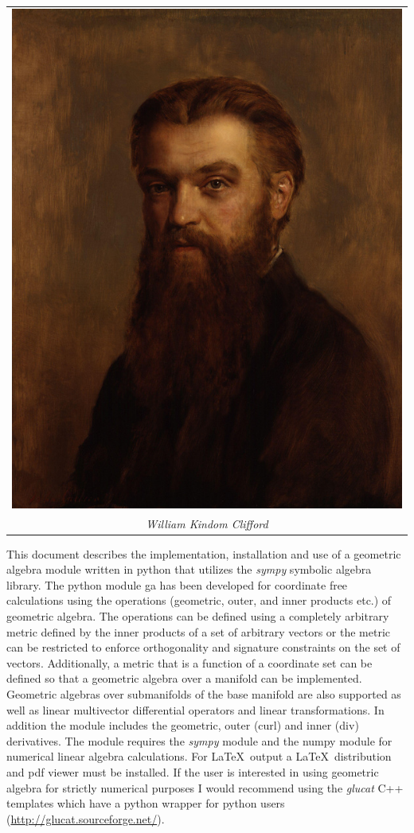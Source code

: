 \documentclass[12pt]{report}
\begin{document}
\begin{center}
\begin{tabular}{c}
\includegraphics[scale=0.25]{wkclifford.jpg} \\
\emph{William Kindom Clifford}
\end{tabular} 
\end{center}

   This document describes the implementation, installation and use of a
   geometric algebra module written in
   python that utilizes the \emph{sympy} symbolic algebra library.  The python
   module ga has been developed for coordinate free calculations using
   the operations (geometric, outer, and inner products etc.) of geometric algebra.
   The operations can be defined using a completely arbitrary metric defined
   by the inner products of a set of arbitrary vectors or the metric can be
   restricted to enforce orthogonality and signature constraints on the set of
   vectors.  Additionally, a metric that is a function of a coordinate set can
   be defined so that a geometric algebra over a manifold can be implemented.
   Geometric algebras over submanifolds of the base manifold are also supported as
   well as linear multivector differential operators and linear transformations.
   In addition the module includes the geometric, outer (curl) and inner
   (div) derivatives. The module requires the \emph{sympy} module and the numpy module for numerical linear
   algebra calculations.  For \LaTeX\ output a \LaTeX\ distribution and pdf viewer must be installed.  If the
   user is interested in using geometric algebra for strictly numerical purposes I would recommend using the 
   \emph{glucat} C++ templates which have a python wrapper for python users (\url{http://glucat.sourceforge.net/}).
   
\end{document}

